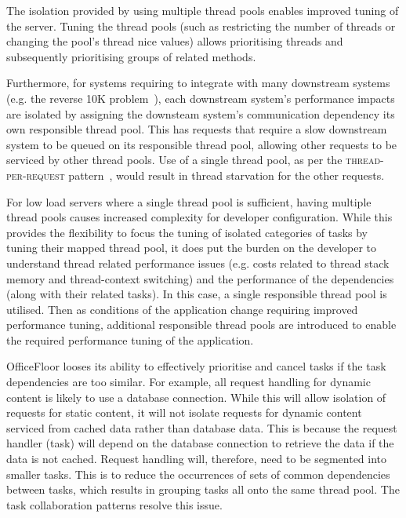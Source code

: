 \documentclass[prodmode]{style/acmlarge}
\begin{document}
The isolation provided by using multiple thread pools enables improved tuning of
the server.  Tuning the thread pools (such as restricting the number of threads
or changing the pool's thread nice values) allows prioritising threads and
subsequently prioritising groups of related methods.

Furthermore, for systems requiring to integrate with many downstream systems
(e.g. the reverse 10K problem~\cite{reverse-ten-k-problem}), each downstream
system's performance impacts are isolated by assigning the downsteam system's
communication dependency its own responsible thread pool.  This has requests
that require a slow downstream system to be queued on its responsible thread
pool, allowing other requests to be serviced by other thread pools.  Use of a
single thread pool, as per the \textsc{thread-per-request}
pattern~\cite{thread-per-request}, would result in thread starvation for the
other requests.

For low load servers where a single thread pool is sufficient, having multiple
thread pools causes increased complexity for developer configuration.  While
this provides the flexibility to focus the tuning of isolated categories of
tasks by tuning their mapped thread pool, it does put the burden on the
developer to understand thread related performance issues (e.g. costs related to
thread stack memory and thread-context switching) and the performance of the
dependencies (along with their related tasks).  In this case, a single
responsible thread pool is utilised.  Then as conditions of the application
change requiring improved performance tuning, additional responsible thread
pools are introduced to enable the required performance tuning of the
application.

OfficeFloor looses its ability to effectively prioritise and cancel tasks if the
task dependencies are too similar.  For example, all request handling for
dynamic content is likely to use a database connection.  While this will allow
isolation of requests for static content, it will not isolate requests for
dynamic content serviced from cached data rather than database data.  This is
because the request handler (task) will depend on the database connection to
retrieve the data if the data is not cached.  Request handling will, therefore,
need to be segmented into smaller tasks.  This is to reduce the occurrences of
sets of common dependencies between tasks, which results in grouping tasks all
onto the same thread pool.  The task collaboration patterns resolve this issue.
\end{document}
